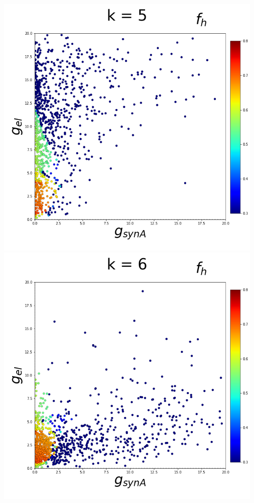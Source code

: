 \documentclass[11pt]{article}
\begin{document}
\begin{center}
\includegraphics[scale=0.125]{DSN_figs/STGCircuit_DSN_c=0_rs=2_k=5.png}
\includegraphics[scale=0.125]{DSN_figs/STGCircuit_DSN_c=0_rs=2_k=6.png}

\end{center}
\end{document}
